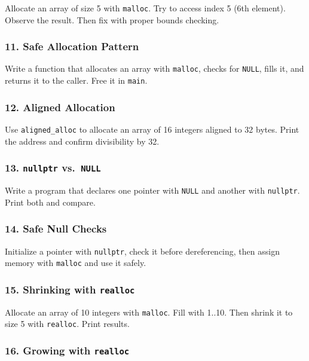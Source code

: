 \documentclass[
  letterpaper,
  DIV=11,
  numbers=noendperiod]{scrreprt}
\begin{document}
Allocate an array of size 5 with \texttt{malloc}. Try to access index 5
(6th element). Observe the result. Then fix with proper bounds checking.

\subsubsection{11. Safe Allocation
Pattern}\label{safe-allocation-pattern}

Write a function that allocates an array with \texttt{malloc}, checks
for \texttt{NULL}, fills it, and returns it to the caller. Free it in
\texttt{main}.

\subsubsection{12. Aligned Allocation}\label{aligned-allocation}

Use \texttt{aligned\_alloc} to allocate an array of 16 integers aligned
to 32 bytes. Print the address and confirm divisibility by 32.

\subsubsection{\texorpdfstring{13. \texttt{nullptr}
vs.~\texttt{NULL}}{13. nullptr vs.~NULL}}\label{nullptr-vs.-null}

Write a program that declares one pointer with \texttt{NULL} and another
with \texttt{nullptr}. Print both and compare.

\subsubsection{14. Safe Null Checks}\label{safe-null-checks}

Initialize a pointer with \texttt{nullptr}, check it before
dereferencing, then assign memory with \texttt{malloc} and use it
safely.

\subsubsection{\texorpdfstring{15. Shrinking with
\texttt{realloc}}{15. Shrinking with realloc}}\label{shrinking-with-realloc}

Allocate an array of 10 integers with \texttt{malloc}. Fill with 1..10.
Then shrink it to size 5 with \texttt{realloc}. Print results.

\subsubsection{\texorpdfstring{16. Growing with
\texttt{realloc}}{16. Growing with realloc}}\label{growing-with-realloc}
\end{document}
